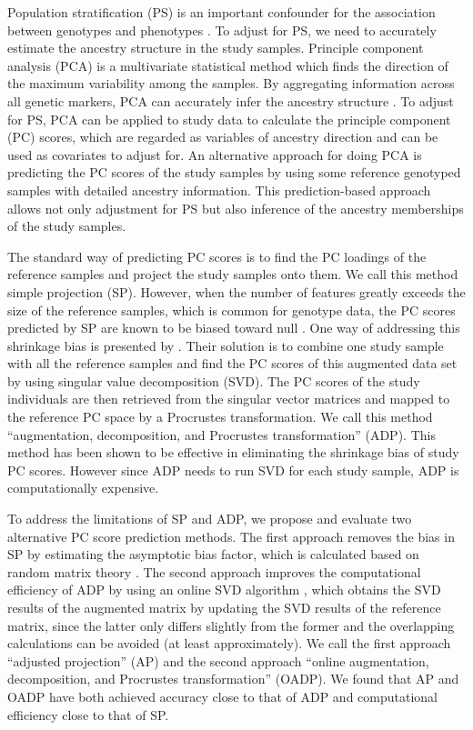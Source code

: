 \documentclass{article}
\begin{document}
Population stratification (PS) is an important confounder for the association between
genotypes and phenotypes \citep{price2006principal}.
To adjust for PS, we need to accurately estimate the ancestry structure in the study samples.
Principle component analysis (PCA) is a multivariate statistical method
which finds the direction of the maximum variability among the samples.
By aggregating information across all genetic markers,
PCA can accurately infer the ancestry structure \citep{reich2008principal}.
To adjust for PS,
PCA can be applied to study data to calculate the principle component (PC) scores,
which are regarded as variables of ancestry direction
and can be used as covariates to adjust for.
An alternative approach for doing PCA is
predicting the PC scores of the study samples
by using some reference genotyped samples with detailed ancestry information.
This prediction-based approach allows not only adjustment for PS
but also inference of the ancestry memberships of the study samples. 

The standard way of predicting PC scores is to find the PC loadings of the reference samples and project the study samples onto them.
We call this method simple projection (SP).
However, when the number of features greatly exceeds the size of the reference samples,
which is common for genotype data,
the PC scores predicted by SP are known to be biased toward null \citep{dey2016asymptotic}.
One way of addressing this shrinkage bias is presented by \citet{wang2014ancestry, wang2015improved}.
Their solution is to combine one study sample with all the reference samples and
find the PC scores of this augmented data set by using singular value decomposition (SVD).
The PC scores of the study individuals are then retrieved from the singular vector matrices and mapped to the reference PC space by a Procrustes transformation.
We call this method ``augmentation, decomposition, and Procrustes transformation'' (ADP).
This method has been shown to be effective in eliminating the shrinkage bias of study PC scores.
However since ADP needs to run SVD for each study sample,
ADP is computationally expensive.

To address the limitations of SP and ADP,
we propose and evaluate two alternative PC score prediction methods.
The first approach removes the bias in SP by estimating the asymptotic bias factor,
which is calculated based on random matrix theory \citep{dey2016asymptotic}.
The second approach improves the computational efficiency of ADP
by using an online SVD algorithm \citep{halko2011finding}, 
which obtains the SVD results of the augmented matrix
by updating the SVD results of the reference matrix,
since the latter only differs slightly from the former
and the overlapping calculations can be avoided
(at least approximately).
We call the first approach ``adjusted projection'' (AP)
and the second approach ``online augmentation, decomposition, and Procrustes transformation'' (OADP). 
We found that AP and OADP have both achieved accuracy close to that of ADP
and computational efficiency close to that of SP.
\end{document}
